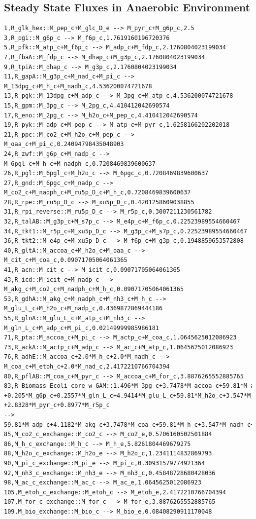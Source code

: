 \documentclass{article}
\begin{document}
\begin{landscape}
\subsection*{Steady State Fluxes in Anaerobic Environment}
\begin{verbatim}
1,R_glk_hex::M_pep_c+M_glc_D_e --> M_pyr_c+M_g6p_c,2.5
3,R_pgi::M_g6p_c --> M_f6p_c,1.7619160196720376
5,R_pfk::M_atp_c+M_f6p_c --> M_adp_c+M_fdp_c,2.1760804023199034
7,R_fbaA::M_fdp_c --> M_dhap_c+M_g3p_c,2.1760804023199034
9,R_tpiA::M_dhap_c --> M_g3p_c,2.1760804023199034
11,R_gapA::M_g3p_c+M_nad_c+M_pi_c --> M_13dpg_c+M_h_c+M_nadh_c,4.536200074721678
13,R_pgk::M_13dpg_c+M_adp_c --> M_3pg_c+M_atp_c,4.536200074721678
15,R_gpm::M_3pg_c --> M_2pg_c,4.410412042690574
17,R_eno::M_2pg_c --> M_h2o_c+M_pep_c,4.410412042690574
19,R_pyk::M_adp_c+M_pep_c --> M_atp_c+M_pyr_c,1.6258166202202018
21,R_ppc::M_co2_c+M_h2o_c+M_pep_c --> M_oaa_c+M_pi_c,0.24094798435048903
24,R_zwf::M_g6p_c+M_nadp_c --> M_6pgl_c+M_h_c+M_nadph_c,0.7208469839600637
26,R_pgl::M_6pgl_c+M_h2o_c --> M_6pgc_c,0.7208469839600637
27,R_gnd::M_6pgc_c+M_nadp_c --> M_co2_c+M_nadph_c+M_ru5p_D_c+M_h_c,0.7208469839600637
28,R_rpe::M_ru5p_D_c --> M_xu5p_D_c,0.4201258609038855
31,R_rpi_reverse::M_ru5p_D_c --> M_r5p_c,0.3007211230561782
32,R_talAB::M_g3p_c+M_s7p_c --> M_e4p_c+M_f6p_c,0.22523989554660467
34,R_tkt1::M_r5p_c+M_xu5p_D_c --> M_g3p_c+M_s7p_c,0.22523989554660467
36,R_tkt2::M_e4p_c+M_xu5p_D_c --> M_f6p_c+M_g3p_c,0.1948859653572808
40,R_gltA::M_accoa_c+M_h2o_c+M_oaa_c --> M_cit_c+M_coa_c,0.09071705064061365
41,R_acn::M_cit_c --> M_icit_c,0.09071705064061365
43,R_icd::M_icit_c+M_nadp_c --> M_akg_c+M_co2_c+M_nadph_c+M_h_c,0.09071705064061365
53,R_gdhA::M_akg_c+M_nadph_c+M_nh3_c+M_h_c --> M_glu_L_c+M_h2o_c+M_nadp_c,0.4369872869444186
55,R_glnA::M_glu_L_c+M_atp_c+M_nh3_c --> M_gln_L_c+M_adp_c+M_pi_c,0.02149999985986181
71,R_pta::M_accoa_c+M_pi_c --> M_actp_c+M_coa_c,1.0645625012086923
73,R_ackA::M_actp_c+M_adp_c --> M_ac_c+M_atp_c,1.0645625012086923
76,R_adhE::M_accoa_c+2.0*M_h_c+2.0*M_nadh_c --> M_coa_c+M_etoh_c+2.0*M_nad_c,2.4172210766704394
80,R_pflAB::M_coa_c+M_pyr_c --> M_accoa_c+M_for_c,3.8876265552885765
83,R_Biomass_Ecoli_core_w_GAM::1.496*M_3pg_c+3.7478*M_accoa_c+59.81*M_atp_c+0.361*M_e4p_c+0.0709*M_f6p_c+0.129*M_g3p_c
+0.205*M_g6p_c+0.2557*M_gln_L_c+4.9414*M_glu_L_c+59.81*M_h2o_c+3.547*M_nad_c+13.0279*M_nadph_c+1.7867*M_oaa_c+0.5191*M_pep_c
+2.8328*M_pyr_c+0.8977*M_r5p_c 
--> 59.81*M_adp_c+4.1182*M_akg_c+3.7478*M_coa_c+59.81*M_h_c+3.547*M_nadh_c+13.0279*M_nadp_c+59.81*M_pi_c+M_bio_c,0.08408290911170048
85,M_co2_c_exchange::M_co2_c --> M_co2_e,0.5706160502501884
86,M_h_c_exchange::M_h_c --> M_h_e,5.8261804469679275
88,M_h2o_c_exchange::M_h2o_e --> M_h2o_c,1.2341114832869793
90,M_pi_c_exchange::M_pi_e --> M_pi_c,0.30931579774921364
92,M_nh3_c_exchange::M_nh3_e --> M_nh3_c,0.45848728680428036
98,M_ac_c_exchange::M_ac_c --> M_ac_e,1.0645625012086923
105,M_etoh_c_exchange::M_etoh_c --> M_etoh_e,2.4172210766704394
107,M_for_c_exchange::M_for_c --> M_for_e,3.8876265552885765
109,M_bio_exchange::M_bio_c --> M_bio_e,0.08408290911170048
\end{verbatim}
\end{landscape}
\end{document}
